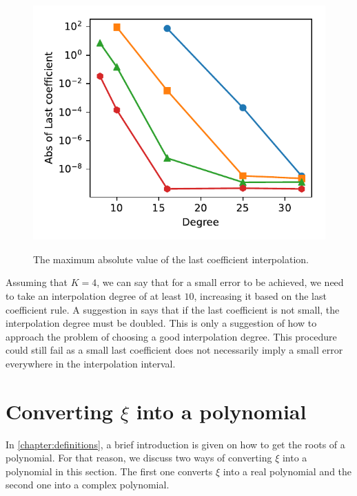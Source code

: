 \begin{figure}
	\centering
	\caption{The maximum absolute value of the last coefficient interpolation.}
	\includegraphics[scale=.9]{tex/figures/last_coeff}
	\fautor
	\label{fig:last-coeff}
\end{figure}

Assuming that $K=4$, we can say that for a small error to be achieved, we need to take an interpolation degree of at least $10$, increasing it based on the last coefficient rule. A suggestion in  says that if the last coefficient is not small, the interpolation degree must be doubled. 
This is only a suggestion of how to approach the problem of choosing a good interpolation degree. 
This procedure could still fail as a small last coefficient does not necessarily imply a small error everywhere in the interpolation interval. 

\section{Converting $\xi$ into a polynomial}

In \autoref{chapter:definitions}, a brief introduction is given on how to get the roots of a polynomial. For that reason, we discuss two ways of converting $\xi$ into a polynomial in this section. The first one converts $\xi$ into a real polynomial and the second one into a complex polynomial. 


